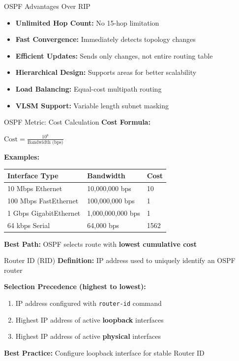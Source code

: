 \documentclass[12pt,a4paper]{article}
\begin{document}
\begin{theorybox}{OSPF Advantages Over RIP}
\begin{itemize}[noitemsep]
    \item \textbf{Unlimited Hop Count:} No 15-hop limitation
    \item \textbf{Fast Convergence:} Immediately detects topology changes
    \item \textbf{Efficient Updates:} Sends only changes, not entire routing table
    \item \textbf{Hierarchical Design:} Supports areas for better scalability
    \item \textbf{Load Balancing:} Equal-cost multipath routing
    \item \textbf{VLSM Support:} Variable length subnet masking
\end{itemize}
\end{theorybox}

\begin{theorybox}{OSPF Metric: Cost Calculation}
\textbf{Cost Formula:}
\begin{center}
\large{$\text{Cost} = \frac{10^8}{\text{Bandwidth (bps)}}$}
\end{center}

\vspace{0.2cm}
\textbf{Examples:}
\begin{center}
\begin{tabular}{lll}
\toprule
\textbf{Interface Type} & \textbf{Bandwidth} & \textbf{Cost} \\
\midrule
10 Mbps Ethernet & 10,000,000 bps & 10 \\
100 Mbps FastEthernet & 100,000,000 bps & 1 \\
1 Gbps GigabitEthernet & 1,000,000,000 bps & 1 \\
64 kbps Serial & 64,000 bps & 1562 \\
\bottomrule
\end{tabular}
\end{center}

\textbf{Best Path:} OSPF selects route with \textbf{lowest cumulative cost}
\end{theorybox}

\begin{theorybox}{Router ID (RID)}
\textbf{Definition:} IP address used to uniquely identify an OSPF router

\vspace{0.2cm}
\textbf{Selection Precedence (highest to lowest):}
\begin{enumerate}[noitemsep]
    \item IP address configured with \texttt{router-id} command
    \item Highest IP address of active \textbf{loopback} interfaces
    \item Highest IP address of active \textbf{physical} interfaces
\end{enumerate}

\vspace{0.2cm}
\textbf{Best Practice:} Configure loopback interface for stable Router ID
\end{theorybox}
\end{document}
